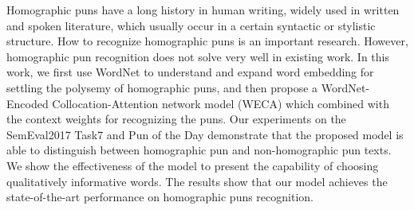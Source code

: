 Homographic puns have a long history in human writing, widely used in written and spoken literature, which usually occur in a certain syntactic or stylistic structure. How to recognize homographic puns is an important research. However, homographic pun recognition does not solve very well in existing work. In this work, we first use WordNet to understand and expand word embedding for settling the polysemy of homographic puns, and then propose a WordNet-Encoded Collocation-Attention network model (WECA) which combined with the context weights for recognizing the puns. Our experiments on the SemEval2017 Task7 and Pun of the Day demonstrate that the proposed model is able to distinguish between homographic pun and non-homographic pun texts. We show the effectiveness of the model to present the capability of choosing qualitatively informative words. The results show that our model achieves the state-of-the-art performance on homographic puns recognition.
